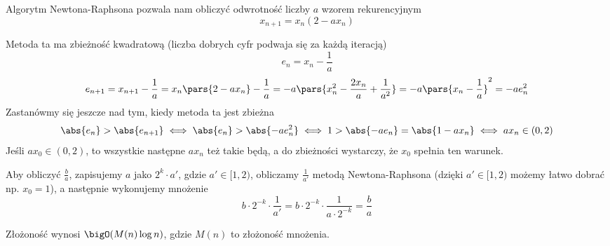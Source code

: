 Algorytm Newtona-Raphsona pozwala nam obliczyć odwrotność liczby \(a\) wzorem rekurencyjnym
\[
	x_{n+1} = x_n(2 - a x_n)
\]

Metoda ta ma zbieżność kwadratową (liczba dobrych cyfr podwaja się za każdą iteracją)
\[
	e_n = x_n - \frac{1}{a}
\]
\[
	e_{n+1} = x_{n+1} - \frac{1}{a} = x_n\pars{2 - a x_n} - \frac{1}{a} = -a\pars{x_n^2 - \frac{2 x_n}{a} + \frac{1}{a^2}} = -a\pars{x_n - \frac{1}{a}}^2 = -a e_n^2
\]
Zastanówmy się jeszcze nad tym, kiedy metoda ta jest zbieżna
\[
	\abs{e_n} > \abs{e_{n+1}} \iff \abs{e_n} > \abs{-a e_n^2} \iff 1 > \abs{-a e_n} = \abs{1 - a x_n} \iff a x_n \in (0, 2)
\]
Jeśli \(a x_0 \in (0, 2)\), to wszystkie następne \(a x_n\) też takie będą, a do zbieżności wystarczy, że \(x_0\) spełnia ten warunek.

Aby obliczyć \(\frac{b}{a}\), zapisujemy \(a\) jako \(2^k \cdot a'\), gdzie \(a' \in [1, 2)\), obliczamy \(\frac{1}{a'}\) metodą Newtona-Raphsona (dzięki \(a' \in [1, 2)\) możemy łatwo dobrać np. \(x_0 = 1\)), a następnie wykonujemy mnożenie
\[
	b \cdot 2^{-k} \cdot \frac{1}{a'} = b \cdot 2^{-k} \cdot \frac{1}{a \cdot 2^{-k}} = \frac{b}{a}
\]

Złożoność wynosi \(\bigO(M(n) \log n)\), gdzie \(M(n)\) to złożoność mnożenia.
